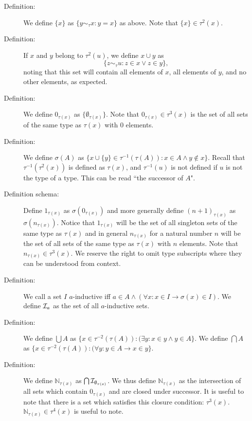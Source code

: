 \documentclass[12pt]{article}
\begin{document}
\begin{description}

\item[Definition:]  We define $\{x\}$ as $\{y \sim_\tau x:y=x\}$ as above.  Note that $\{x\} \in \tau^2(x)$.

\item[Definition:]  If $x$ and $y$ belong to $\tau^2(u)$, we define $x \cup y$ as $$\{z \sim_\tau u:z \in x \vee z \in y\},$$ noting that this set will contain all elements of $x$, all elements of $y$, and no other elements, as expected.

\item[Definition:]  We define $0_{\tau(x)}$ as $\{\emptyset_{\tau(x)}\}$.  Note that $0_{\tau(x)} \in \tau^3(x)$ is the set of all sets of the same type as $\tau(x)$ with 0 elements.

\item[Definition:]  We define $\sigma(A)$ as $\{x \cup \{y\} \in \tau^{-1}(\tau(A)):x \in A \wedge y \not\in x\}$.  Recall that  $\tau^{-1}(\tau^2(x))$ is defined as $\tau(x)$, and $\tau^{-1}(u)$ is not defined if $u$ is not the type of a type.  This can be read ``the successor of $A$".  

\item[Definition schema:]  Define $1_{\tau(x)}$ as $\sigma(0_{\tau(x)})$ and more generally define \mbox{$(n+1)_{\tau(x)}$} as $\sigma(n_{\tau(x)})$.  Notice that $1_{\tau(x)}$ will be
the set of all singleton sets of the same type as $\tau(x)$ and in general $n_{\tau(x)}$ for a natural number $n$ will be the set of all sets of the same type as $\tau(x)$ with $n$ elements.
Note that $n_{\tau(x)} \in \tau^3(x)$.  We reserve the right to omit type subscripts where they can be understood from context.

\item[Definition:]  We call a set $I$ $a$-inductive iff $a \in A \wedge (\forall x:x \in I \rightarrow \sigma(x) \in I)$.  We define ${\cal I}_{a}$ as the set of all $a$-inductive sets.

\item[Definition:]  We define $\bigcup A$ as $\{x \in \tau^{-2}(\tau(A)):(\exists y:x \in y \wedge y \in A\}$.  We define  $\bigcap A$ as $\{x \in \tau^{-2}(\tau(A)):(\forall y:y \in A  \rightarrow x \in y\}$.

\item[Definition:]  We define $\mathbb N_{\tau(x)}$ as $\bigcap {\cal I}_{\emptyset_{\tau(x)}}$.  We thus define $\mathbb N_{\tau(x)}$ as the intersection of all sets which
contain $0_{\tau(x)}$ and are closed under successor.  It is useful to note that there is a set which satisfies this closure condition:  $\tau^3(x)$.  $\mathbb N_{\tau(x)}\in \tau^4(x)$ is useful to note.


\end{description}
\end{document}
